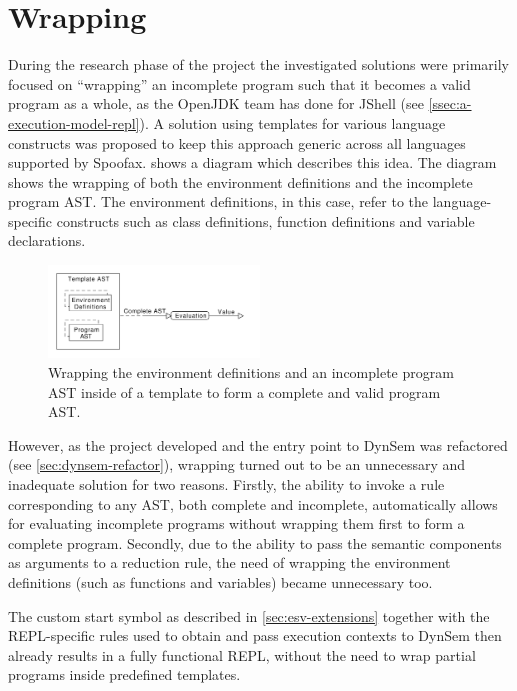 \section{Wrapping}
\label{sec:wrapping}

During the research phase of the project the investigated solutions were
primarily focused on ``wrapping'' an incomplete program such that it becomes a
valid program as a whole, as the OpenJDK team has done for JShell (see
\cref{ssec:a-execution-model-repl}). A solution using templates for various
language constructs was proposed to keep this approach generic across all
languages supported by Spoofax.  shows a diagram which
describes this idea. The diagram shows the wrapping of both the environment
definitions and the incomplete program AST. The environment definitions, in
this case, refer to the language-specific constructs such as class definitions,
function definitions and variable declarations.

\begin{figure}[b]
  \centering
  \includegraphics[width=0.5\textwidth]{wrapping}
  \caption{Wrapping the environment definitions and an incomplete program AST
    inside of a template to form a complete and valid program AST.}
  \label{fig:wrapping}
\end{figure}

However, as the project developed and the entry point to DynSem was refactored
(see \cref{sec:dynsem-refactor}), wrapping turned out to be an
unnecessary and inadequate solution for two reasons. Firstly, the ability to
invoke a rule corresponding to any AST, both complete and incomplete,
automatically allows for evaluating incomplete programs without wrapping them
first to form a complete program. Secondly, due to the ability to pass the
semantic components as arguments to a reduction rule, the need of wrapping the
environment definitions (such as functions and variables) became unnecessary
too.

The custom start symbol as described in \cref{sec:esv-extensions} together with
the REPL-specific rules used to obtain and pass execution contexts to DynSem
then already results in a fully functional REPL, without the need to wrap
partial programs inside predefined templates.

